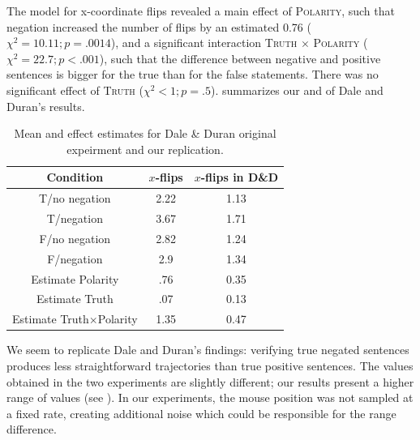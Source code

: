 \documentclass[draft]{article}
\begin{document}
The model for x-coordinate flips revealed a main effect of \textsc{Polarity}, such that negation increased the number of flips by an estimated 0.76 ($\chi^{2}=10.11; p=.0014$), and a significant interaction \textsc{Truth} $\times$ \textsc{Polarity} ($\chi^{2}=22.7; p<.001$), such that the difference between negative and positive sentences is bigger for the true than for the false statements. There was no significant effect of \textsc{Truth} ($\chi^{2}<1; p=.5$). 
 summarizes our and of Dale and Duran's results. 

\begin{table}[h]
\begin{center}
\begin{tabular}{ccc}
Condition & $x$-flips &  $x$-flips in D\&D \\
\hline
T/no negation & 2.22 & 1.13 \\
T/negation & 3.67 & 1.71 \\
F/no negation & 2.82 & 1.24 \\
F/negation & 2.9 & 1.34 \\
Estimate Polarity & .76 & 0.35 \\
Estimate Truth & .07 & 0.13 \\
Estimate Truth$\times$Polarity & 1.35 & 0.47\\
\end{tabular}
\caption{Mean and effect estimates for Dale \& Duran original expeirment and our replication.}
\label{table:negationresults}
\end{center}
\end{table}%

We seem to replicate Dale and Duran's findings: verifying true negated sentences produces less straightforward trajectories than true positive sentences. The values obtained in the two experiments are slightly different; our results present a higher range of values (see ). 
In our experiments, the mouse position was not sampled at a fixed rate, creating additional noise which could be responsible for the range difference. 

\end{document}
